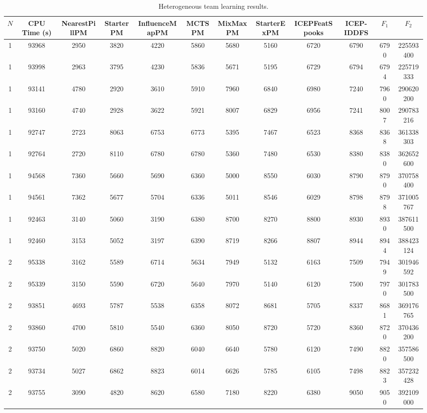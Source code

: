 \documentclass[journal]{IEEEtran}
\begin{document}
\begin{table}
\caption{Heterogeneous team learning results.}
\label{tab:results_heterogeneous}
\centering
\footnotesize
\begin{tabular}{|cc|cccccccc|cc|}
\hline																							
$N$	&	CPU Time (s)	&	NearestPillPM	&	StarterPM	&	InfluenceMapPM	&	MCTSPM	&	MixMaxPM	&	StarterExPM	&	ICEPFeatSpooks	&	ICEP-IDDFS	&	$F_1$	&	$F_2$	\\
\hline																							
1	&	93968	&	2950	&	3820	&	4220	&	5860	&	5680	&	5160	&	6720	&	6790	&	6790	&	225593400	\\
1	&	93998	&	2963	&	3795	&	4230	&	5836	&	5671	&	5195	&	6729	&	6794	&	6794	&	225719333	\\
1	&	93141	&	4780	&	2920	&	3610	&	5910	&	7960	&	6840	&	6980	&	7240	&	7960	&	290620200	\\
1	&	93160	&	4740	&	2928	&	3622	&	5921	&	8007	&	6829	&	6956	&	7241	&	8007	&	290783216	\\
1	&	92747	&	2723	&	8063	&	6753	&	6773	&	5395	&	7467	&	6523	&	8368	&	8368	&	361338303	\\
1	&	92764	&	2720	&	8110	&	6780	&	6780	&	5360	&	7480	&	6530	&	8380	&	8380	&	362652600	\\
1	&	94568	&	7360	&	5660	&	5690	&	6360	&	5000	&	8550	&	6030	&	8790	&	8790	&	370758400	\\
1	&	94561	&	7362	&	5677	&	5704	&	6336	&	5011	&	8546	&	6029	&	8798	&	8798	&	371005767	\\
1	&	92463	&	3140	&	5060	&	3190	&	6380	&	8700	&	8270	&	8800	&	8930	&	8930	&	387611500	\\
1	&	92460	&	3153	&	5052	&	3197	&	6390	&	8719	&	8266	&	8807	&	8944	&	8944	&	388423124	\\
\hline																							
2	&	95338	&	3162	&	5589	&	6714	&	5634	&	7949	&	5132	&	6163	&	7509	&	7949	&	301946592	\\
2	&	95339	&	3150	&	5590	&	6720	&	5640	&	7970	&	5140	&	6120	&	7500	&	7970	&	301783500	\\
2	&	93851	&	4693	&	5787	&	5538	&	6358	&	8072	&	8681	&	5705	&	8337	&	8681	&	369176765	\\
2	&	93860	&	4700	&	5810	&	5540	&	6360	&	8050	&	8720	&	5720	&	8360	&	8720	&	370436200	\\
2	&	93750	&	5020	&	6860	&	8820	&	6040	&	6640	&	5780	&	6120	&	7490	&	8820	&	357586500	\\
2	&	93734	&	5027	&	6862	&	8823	&	6014	&	6626	&	5785	&	6105	&	7498	&	8823	&	357232428	\\
2	&	93755	&	3090	&	4820	&	8620	&	6580	&	7180	&	8220	&	6380	&	9050	&	9050	&	392109000	\\

\end{tabular}
\end{table}
\end{document}
